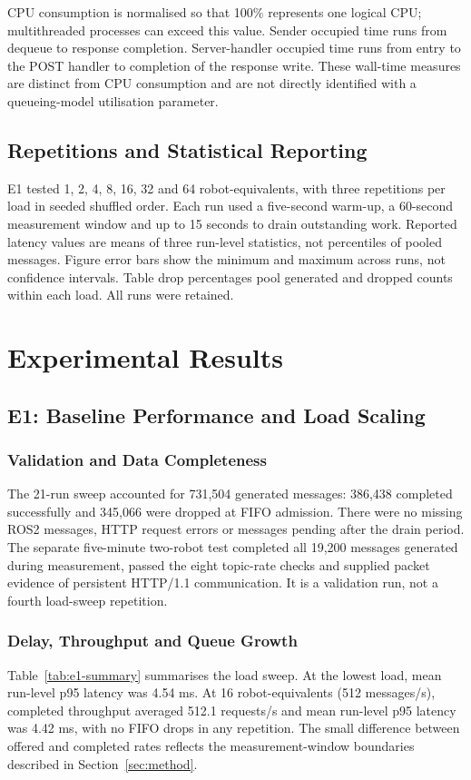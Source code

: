 \documentclass[10pt,a4paper,twocolumn,twoside]{tau-class/tau}
\begin{document}
CPU consumption is normalised so that 100\% represents one logical CPU;
multithreaded processes can exceed this value. Sender occupied time runs
from dequeue to response completion. Server-handler occupied time runs
from entry to the POST handler to completion of the response write. These
wall-time measures are distinct from CPU consumption and are not directly
identified with a queueing-model utilisation parameter.

\subsection{Repetitions and Statistical Reporting}
E1 tested 1, 2, 4, 8, 16, 32 and 64 robot-equivalents, with three repetitions
per load in seeded shuffled order. Each run used a five-second warm-up,
a 60-second measurement window and up to 15 seconds to drain outstanding
work. Reported latency values are means of three run-level statistics,
not percentiles of pooled messages. Figure error bars show the minimum
and maximum across runs, not confidence intervals. Table drop percentages
pool generated and dropped counts within each load. All runs were retained.

\section{Experimental Results}
\label{sec:results}

\subsection{E1: Baseline Performance and Load Scaling}
\label{sec:e1}

\subsubsection{Validation and Data Completeness}
The 21-run sweep accounted for 731,504 generated messages: 386,438
completed successfully and 345,066 were dropped at FIFO admission.
There were no missing ROS2 messages, HTTP request errors or messages
pending after the drain period. The separate five-minute two-robot test
completed all 19,200 messages generated during measurement, passed the
eight topic-rate checks and supplied packet evidence of persistent
HTTP/1.1 communication. It is a validation run, not a fourth load-sweep
repetition.

\subsubsection{Delay, Throughput and Queue Growth}
Table~\ref{tab:e1-summary} summarises the load sweep. At the lowest load,
mean run-level p95 latency was 4.54 ms. At 16 robot-equivalents
(512 messages/s), completed throughput averaged 512.1 requests/s and
mean run-level p95 latency was 4.42 ms, with no FIFO drops in any repetition.
The small difference between offered and completed rates reflects the
measurement-window boundaries described in Section~\ref{sec:method}.
\end{document}
